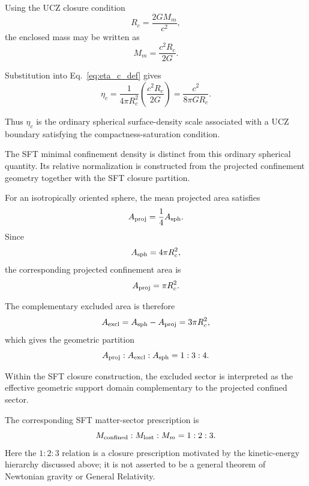 \documentclass[12pt]{article}
\begin{document}
Using the UCZ closure condition
\begin{equation}
R_c=\frac{2GM_m}{c^2},
\label{eq:ucz_closure_eta}
\end{equation}
the enclosed mass may be written as
\begin{equation}
M_m=\frac{c^2R_c}{2G}.
\end{equation}

Substitution into Eq.~\eqref{eq:eta_c_def} gives
\begin{equation}
\eta_c
=
\frac{1}{4\pi R_c^2}
\left(
\frac{c^2R_c}{2G}
\right)
=
\frac{c^2}{8\pi G R_c}.
\label{eq:eta_c_result}
\end{equation}

Thus $\eta_c$ is the ordinary spherical surface-density scale associated
with a UCZ boundary satisfying the compactness-saturation condition.

The SFT minimal confinement density is distinct from this ordinary
spherical quantity. Its relative normalization is constructed from the
projected confinement geometry together with the SFT closure partition.

For an isotropically oriented sphere, the mean projected area satisfies
\begin{equation}
A_{\rm proj}
=
\frac14 A_{\rm sph}.
\end{equation}
Since
\begin{equation}
A_{\rm sph}=4\pi R_c^2,
\end{equation}
the corresponding projected confinement area is
\begin{equation}
A_{\rm proj}=\pi R_c^2.
\end{equation}

The complementary excluded area is therefore
\begin{equation}
A_{\rm excl}
=
A_{\rm sph}-A_{\rm proj}
=
3\pi R_c^2,
\end{equation}
which gives the geometric partition
\begin{equation}
A_{\rm proj}:A_{\rm excl}:A_{\rm sph}
=
1:3:4.
\label{eq:area_partition}
\end{equation}

Within the SFT closure construction, the excluded sector is interpreted
as the effective geometric support domain complementary to the projected
confined sector.

The corresponding SFT matter-sector prescription is
\begin{equation}
M_{\rm confined}:M_{\rm lost}:M_m
=
1:2:3.
\label{eq:mass_partition_eta}
\end{equation}
Here the $1{:}2{:}3$ relation is a closure prescription motivated by the
kinetic-energy hierarchy discussed above; it is not asserted to be a
general theorem of Newtonian gravity or General Relativity.
\end{document}
